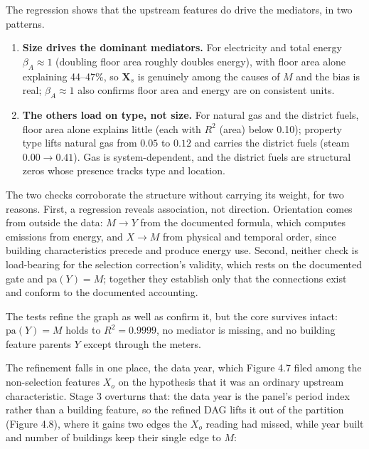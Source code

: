 The regression shows that the upstream features do drive the mediators, in two patterns.

\begin{enumerate}
  \item \textbf{Size drives the dominant mediators.} For electricity and total energy $\beta_A \approx 1$ (doubling floor area roughly doubles energy), with floor area alone explaining 44--47\%, so $\mathbf{X}_s$ is genuinely among the causes of $M$ and the bias is real; $\beta_A \approx 1$ also confirms floor area and energy are on consistent units.
  \item \textbf{The others load on type, not size.} For natural gas and the district fuels, floor area alone explains little (each with $R^2$ (area) below 0.10); property type lifts natural gas from $0.05$ to $0.12$ and carries the district fuels (steam $0.00 \to 0.41$). Gas is system-dependent, and the district fuels are structural zeros whose presence tracks type and location.
\end{enumerate}

The two checks corroborate the structure without carrying its weight, for two reasons. First, a regression reveals association, not direction. Orientation comes from outside the data: $M \to Y$ from the documented formula, which computes emissions from energy, and $X \to M$ from physical and temporal order, since building characteristics precede and produce energy use. Second, neither check is load-bearing for the selection correction's validity, which rests on the documented gate and $\mathrm{pa}(Y) = M$; together they establish only that the connections exist and conform to the documented accounting.

The tests refine the graph as well as confirm it, but the core survives intact: $\mathrm{pa}(Y) = M$ holds to $R^2 = 0.9999$, no mediator is missing, and no building feature parents $Y$ except through the meters.

The refinement falls in one place, the data year, which Figure 4.7 filed among the non-selection features $X_o$ on the hypothesis that it was an ordinary upstream characteristic. Stage 3 overturns that: the data year is the panel's period index rather than a building feature, so the refined DAG lifts it out of the partition (Figure 4.8), where it gains two edges the $X_o$ reading had missed, while year built and number of buildings keep their single edge to $M$:

